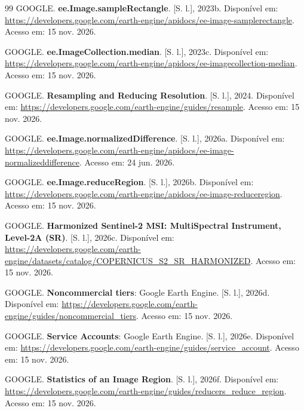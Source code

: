 \begin{thebibliography}{99}
\MakeUppercase{{Google}}.
\textbf{{ee.Image.sampleRectangle}}.
[S. l.], 2023b.
Disponível em: \url{https://developers.google.com/earth-engine/apidocs/ee-image-samplerectangle}.
Acesso em: 15 nov. 2026.

\MakeUppercase{{Google}}.
\textbf{{ee.ImageCollection.median}}.
[S. l.], 2023c.
Disponível em: \url{https://developers.google.com/earth-engine/apidocs/ee-imagecollection-median}.
Acesso em: 15 nov. 2026.

\MakeUppercase{{Google}}.
\textbf{Resampling and Reducing Resolution}.
[S. l.], 2024.
Disponível em: \url{https://developers.google.com/earth-engine/guides/resample}.
Acesso em: 15 nov. 2026.

\MakeUppercase{{Google}}.
\textbf{{ee.Image.normalizedDifference}}.
[S. l.], 2026a.
Disponível em: \url{https://developers.google.com/earth-engine/apidocs/ee-image-normalizeddifference}.
Acesso em: 24 jun. 2026.

\MakeUppercase{{Google}}.
\textbf{{ee.Image.reduceRegion}}.
[S. l.], 2026b.
Disponível em: \url{https://developers.google.com/earth-engine/apidocs/ee-image-reduceregion}.
Acesso em: 15 nov. 2026.

\MakeUppercase{{Google}}.
\textbf{{Harmonized Sentinel-2 MSI}: MultiSpectral Instrument, Level-2A (SR)}.
[S. l.], 2026c.
Disponível em: \url{https://developers.google.com/earth-engine/datasets/catalog/COPERNICUS_S2_SR_HARMONIZED}.
Acesso em: 15 nov. 2026.

\MakeUppercase{{Google}}.
\textbf{Noncommercial tiers}: {Google Earth Engine}.
[S. l.], 2026d.
Disponível em: \url{https://developers.google.com/earth-engine/guides/noncommercial_tiers}.
Acesso em: 15 nov. 2026.

\MakeUppercase{{Google}}.
\textbf{Service Accounts}: {Google Earth Engine}.
[S. l.], 2026e.
Disponível em: \url{https://developers.google.com/earth-engine/guides/service_account}.
Acesso em: 15 nov. 2026.

\MakeUppercase{{Google}}.
\textbf{Statistics of an Image Region}.
[S. l.], 2026f.
Disponível em: \url{https://developers.google.com/earth-engine/guides/reducers_reduce_region}.
Acesso em: 15 nov. 2026.


\end{thebibliography}
